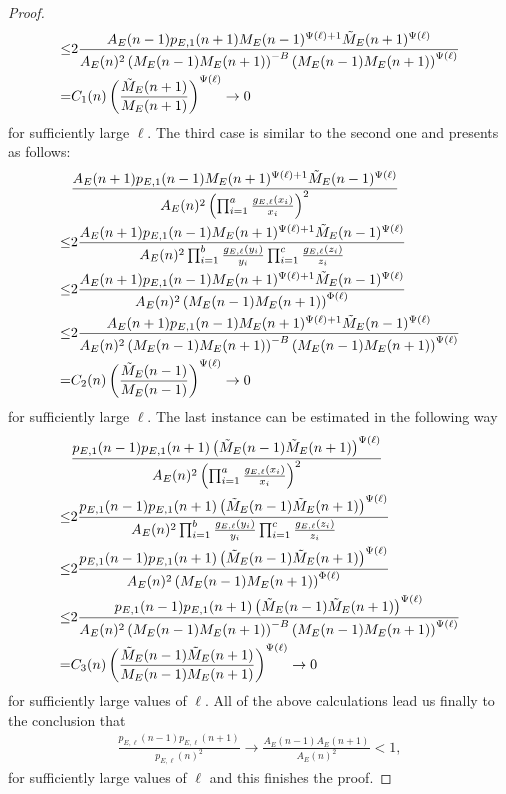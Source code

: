 \documentclass[12pt]{amsart}
\theoremstyle{definition}
\theoremstyle{remark}
\numberwithin{theorem}{section} \numberwithin{equation}{section}
\begin{document}
\begin{proof}
\begin{align*}
\leq
&2\frac{A_E(n-1)p_{E,1}(n+1)M_E(n-1)^{\Psi(\ell)+1}\Tilde{M}_E(n+1)^{\Psi(\ell)}}{A_E(n)^2\left(M_E(n-1)M_E(n+1)\right)^{-
B}\left(M_E(n-1)M_E(n+1)\right)^{\Psi(\ell)}}\\
=&C_1(n)\left(\frac{\Tilde{M}_E(n+1)}{M_E(n+1)}\right)^{\Psi(\ell)}\rightarrow 0
\end{align*}
for sufficiently large $\ell $.
The third case is similar to the second one and presents as follows:
\begin{align*}
&\frac{A_E(n+1)p_{E,1}(n-1)M_E(n+1)^{\Psi(\ell)+1}\Tilde{M}_E(n-1)^{\Psi(\ell)}}{A_E(n)^2\left(\prod_{i=1}^a\frac{g_{E,\ell }(x_i)}{x_i}\right)^2}\\
\leq
&2\frac{A_E(n+1)p_{E,1}(n-1)M_E(n+1)^{\Psi(\ell)+1}\Tilde{M}_E(n-1)^{\Psi(\ell)}}{A_E(n)^2\prod_{i=1}^b\frac{g_{E,\ell }(y_i)}{y_i}\prod_{i=1}^c\frac{g_{E,\ell }(z_i)}{z_i}}\\
\leq& 2\frac{A_E(n+1)p_{E,1}(n-1)M_E(n+1)^{\Psi(\ell)+1}\Tilde{M}_E(n-1)^{\Psi(\ell)}}{A_E(n)^2\left(M_E(n-1)M_E(n+1)\right)^{\Phi(\ell)}}\\
\leq
&2\frac{A_E(n+1)p_{E,1}(n-1)M_E(n+1)^{\Psi(\ell)+1}\Tilde{M}_E(n-1)^{\Psi(\ell)}}{A_E(n)^2\left(M_E(n-1)M_E(n+1)\right)^{-
B}\left(M_E(n-1)M_E(n+1)\right)^{\Psi(\ell)}}\\
=&C_2(n)\left(\frac{\Tilde{M}_E(n-1)}{M_E(n-1)}\right)^{\Psi(\ell)}\rightarrow 0
\end{align*}
for sufficiently large $\ell $.
The last instance can be estimated in the following way
\begin{align*}
&\frac{p_{E,1}(n-1)p_{E,1}(n+1)\left(\Tilde{M}_E(n-1)\Tilde{M}_E(n+1)\right)^{\Psi(\ell)}}{A_E(n)^2\left(\prod_{i=1}^a\frac{g_{E,\ell }(x_i)}{x_i}\right)^2}\\
\leq
&2\frac{p_{E,1}(n-1)p_{E,1}(n+1)\left(\Tilde{M}_E(n-1)\Tilde{M}_E(n+1)\right)^{\Psi(\ell)}}{A_E(n)^2\prod_{i=1}^b\frac{g_{E,\ell }(y_i)}{y_i}\prod_{i=1}^c\frac{g_{E,\ell }(z_i)}{z_i}}\\
\leq& 2\frac{p_{E,1}(n-1)p_{E,1}(n+1)\left(\Tilde{M}_E(n-1)\Tilde{M}_E(n+1)\right)^{\Psi(\ell)}}{A_E(n)^2\left(M_E(n-1)M_E(n+1)\right)^{\Phi(\ell)}}\\
\leq
&2\frac{p_{E,1}(n-1)p_{E,1}(n+1)\left(\Tilde{M}_E(n-1)\Tilde{M}_E(n+1)\right)^{\Psi(\ell)}}{A_E(n)^2\left(M_E(n-1)M_E(n+1)\right)^{-
B}\left(M_E(n-1)M_E(n+1)\right)^{\Psi(\ell)}}\\
=&C_3(n)\left(\frac{\Tilde{M}_E(n-1)\Tilde{M}_E(n+1)}{M_E(n-1)M_E(n+1)}\right)^{\Psi(\ell)}\rightarrow 0
\end{align*}
for sufficiently large values of
$\ell $.
All of the above calculations lead us finally to the conclusion that
\begin{align*}
\frac{p_{E,\ell }(n-1)p_{E,\ell }(n+1)}{p_{E,\ell }(n)^2}\rightarrow \frac{A_E(n-1)A_E(n+1)}{A_E(n)^2}<1,
\end{align*}
for sufficiently large values of
$\ell $
and this finishes the proof.
\end{proof}
\end{document}
